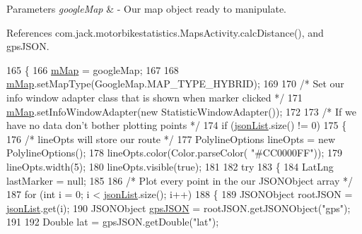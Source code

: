 \begin{DoxyParams}{Parameters}
{\em google\+Map} & -\/ Our map object ready to manipulate. \\
\hline
\end{DoxyParams}


References com.\+jack.\+motorbikestatistics.\+Maps\+Activity.\+calc\+Distance(), and gps\+J\+S\+ON.


\begin{DoxyCode}
165                                                 \{
166         \hyperlink{classcom_1_1jack_1_1motorbikestatistics_1_1_maps_activity_aaace5219464acf3df9ac5e9ce913eef5}{mMap} = googleMap;
167 
168         \hyperlink{classcom_1_1jack_1_1motorbikestatistics_1_1_maps_activity_aaace5219464acf3df9ac5e9ce913eef5}{mMap}.setMapType(GoogleMap.MAP\_TYPE\_HYBRID);
169 
170         \textcolor{comment}{/* Set our info window adapter class that is shown when marker clicked */}
171         \hyperlink{classcom_1_1jack_1_1motorbikestatistics_1_1_maps_activity_aaace5219464acf3df9ac5e9ce913eef5}{mMap}.setInfoWindowAdapter(\textcolor{keyword}{new} StatisticWindowAdapter());
172 
173         \textcolor{comment}{/* If we have no data don't bother plotting points */}
174         \textcolor{keywordflow}{if} (\hyperlink{classcom_1_1jack_1_1motorbikestatistics_1_1_maps_activity_aaed26c36e08dad942830ab52d9d75d2e}{jsonList}.size() != 0)
175         \{
176             \textcolor{comment}{/* lineOpts will store our route */}
177             PolylineOptions lineOpts = \textcolor{keyword}{new} PolylineOptions();
178             lineOpts.color(Color.parseColor( \textcolor{stringliteral}{"#CC0000FF"}));
179             lineOpts.width(5);
180             lineOpts.visible(\textcolor{keyword}{true});
181 
182             \textcolor{keywordflow}{try}
183             \{
184                 LatLng lastMarker = null;
185 
186                 \textcolor{comment}{/* Plot every point in the our JSONObject array */}
187                 \textcolor{keywordflow}{for} (\textcolor{keywordtype}{int} i = 0; i < \hyperlink{classcom_1_1jack_1_1motorbikestatistics_1_1_maps_activity_aaed26c36e08dad942830ab52d9d75d2e}{jsonList}.size(); i++)
188                 \{
189                     JSONObject rootJSON = \hyperlink{classcom_1_1jack_1_1motorbikestatistics_1_1_maps_activity_aaed26c36e08dad942830ab52d9d75d2e}{jsonList}.get(i);
190                     JSONObject \hyperlink{logging-device_8ino_a548727e041a5cd3db91bdbd0ccd71e30}{gpsJSON} = rootJSON.getJSONObject(\textcolor{stringliteral}{"gps"});
191 
192                     Double lat = gpsJSON.getDouble(\textcolor{stringliteral}{"lat"});

\end{DoxyCode}
